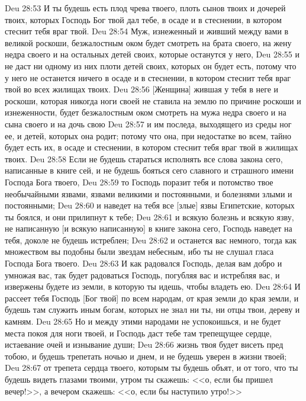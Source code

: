 \vs Deu 28:53 И ты будешь есть плод чрева твоего, плоть сынов твоих и дочерей твоих, которых Господь Бог твой дал тебе, в осаде и в стеснении, в котором стеснит тебя враг твой.
\vs Deu 28:54 Муж, изнеженный и живший между вами в великой роскоши, безжалостным оком будет смотреть на брата своего, на жену недра своего и на остальных детей своих, которые останутся у него,
\vs Deu 28:55 и не даст ни одному из них плоти детей своих, которых он будет есть, потому что у него не останется ничего в осаде и в стеснении, в котором стеснит тебя враг твой во всех жилищах твоих.
\vs Deu 28:56 [Женщина] жившая у тебя в неге и роскоши, которая никогда ноги своей не ставила на землю по причине роскоши и изнеженности, будет безжалостным оком смотреть на мужа недра своего и на сына своего и на дочь свою
\vs Deu 28:57 и  им последа, выходящего из среды ног ее, и детей, которых она родит; потому что она, при недостатке во всем, тайно будет есть их, в осаде и стеснении, в котором стеснит тебя враг твой в жилищах твоих.
\vs Deu 28:58 Если не будешь стараться исполнять все слова закона сего, написанные в книге сей, и не будешь бояться сего славного и страшного имени Господа Бога твоего,
\vs Deu 28:59 то Господь поразит тебя и потомство твое необычайными язвами, язвами великими и постоянными, и болезнями злыми и постоянными;
\vs Deu 28:60 и наведет на тебя все [злые] язвы Египетские, которых ты боялся, и они прилипнут к тебе;
\vs Deu 28:61 и всякую болезнь и всякую язву, не написанную [и всякую написанную] в книге закона сего, Господь наведет на тебя, доколе не будешь истреблен;
\vs Deu 28:62 и останется вас немного, тогда как множеством вы подобны были звездам небесным, ибо ты не слушал гласа Господа Бога твоего.
\vs Deu 28:63 И как радовался Господь, делая вам добро и умножая вас, так будет радоваться Господь, погубляя вас и истребляя вас, и извержены будете из земли, в которую ты идешь, чтобы владеть ею.
\vs Deu 28:64 И рассеет тебя Господь [Бог твой] по всем народам, от края земли до края земли, и будешь там служить иным богам, которых не знал ни ты, ни отцы твои, дереву и камням.
\vs Deu 28:65 Но и между этими народами не успокоишься, и не будет места покоя для ноги твоей, и Господь даст тебе там трепещущее сердце, истаевание очей и изнывание души;
\vs Deu 28:66 жизнь твоя будет висеть пред тобою, и будешь трепетать ночью и днем, и не будешь уверен в жизни твоей;
\vs Deu 28:67 от трепета сердца твоего, которым ты будешь объят, и от того, что ты будешь видеть глазами твоими, утром ты скажешь: <<о, если бы пришел вечер!>>, а вечером скажешь: <<о, если бы наступило утро!>>
